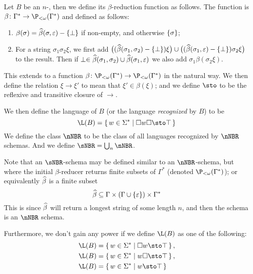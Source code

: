 \documentclass{llncs}
\begin{document}
\begin{definition}

    Let $B$ be an $n$-\NBR, then we define its $\beta$-reduction function as follows.
    The function is $\beta\colon\Gamma^*\to\P_{<\omega}(\Gamma^*)$ and defined as follows:
    \begin{enumerate}
        \item $\beta(\sigma)=\hb(\sigma,\epsilon)-\set\perp$ if non-empty, and otherwise $\set\sigma$;
        \item For a string $\sigma_1\sigma_2\xi$, we first add
        $\bigl((\hb(\sigma_1,\sigma_2)-\set\perp)\xi\bigr)\cup\bigl((\hb(\sigma_1,\epsilon)-\set\perp)\sigma_2\xi\bigr)$ to
        the result.
        Then if $\perp\in\widehat\beta(\sigma_1,\sigma_2)\cup\widehat\beta(\sigma_1,\varepsilon)$ we also add $\sigma_1\beta(\sigma_2\xi)$.
    \end{enumerate}
    This extends to a function $\beta\colon\P_{<\omega}(\Gamma^*)\to\P_{<\omega}(\Gamma^*)$
    in the natural way.
    We then define the relation $\xi\to\xi'$ to mean that $\xi'\in\beta(\xi)$; and we define $\sto$ to be the reflexive and
    transitive closure of $\to$.

    We then define the language of $B$ (or the language \emph{recognized} by $B$) to be
    $$ \L(B) = \set{w\in\Sigma^*}[\square w\square\sto\top] $$
    We define the class $\nNBR$ to be the class of all languages recognized by $\nNBR$ schemas.
    And we define $\sNBR=\bigcup_n\nNBR$.

\end{definition}

Note that an $\sNBR$-schema may be defined similar to an $\nNBR$-schema, but where the initial $\beta$-reducer returns finite
subsets of $\Gamma^*$ (denoted $\P_{<\omega}(\Gamma^*)$); or equivalently $\widehat\beta$ is a finite subset
$$ \hb \subseteq \Gamma\times(\Gamma\cup\set\epsilon)\times\Gamma^* $$
This is since $\widehat\beta$ will return a longest string of some length $n$, and then the schema is an $\nNBR$ schema.

Furthermore, we don't gain any power if we define $\L(B)$ as one of the following:
\begin{align*}
    \L(B) &= \set{w\in\Sigma^*}[\square w\sto\top],\\
    \L(B) &= \set{w\in\Sigma^*}[w\square\sto\top],\\
    \L(B) &= \set{w\in\Sigma^*}[w\sto\top]
\end{align*}
\end{document}

